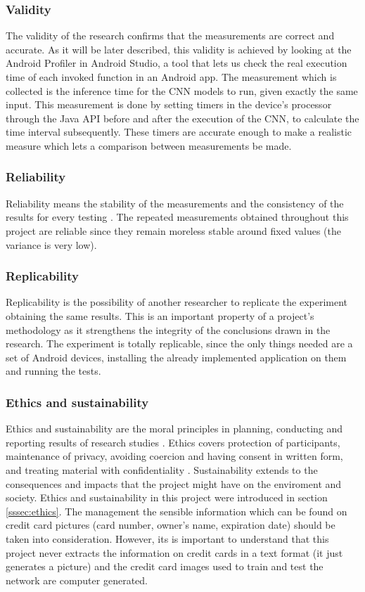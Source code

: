 \subsubsection{Validity} \label{sssec:validity}
	The validity of the research confirms that the measurements are correct and accurate. As it will be later described, this validity is achieved by looking at the Android Profiler in Android Studio, a tool that lets us check the real execution time of each invoked function in an Android app. The measurement which is collected is the inference time for the CNN models to run, given exactly the same input. This measurement is done by setting timers in the device's processor through the Java API before and after the execution of the CNN, to calculate the time interval subsequently. These timers are accurate enough to make a realistic measure which lets a comparison between measurements be made.
\subsubsection{Reliability}
	Reliability means the stability of the measurements and the consistency of the results for every testing \cite{haakansson}. The repeated measurements obtained throughout this project are reliable since they remain moreless stable around fixed values (the variance is very low).
\subsubsection{Replicability}
	Replicability is the possibility of another researcher to replicate the experiment obtaining the same results. This is an important property of a project's methodology as it strengthens the integrity of the conclusions drawn in the research. The experiment is totally replicable, since the only things needed are a set of Android devices, installing the already implemented application on them and running the tests.
\subsubsection{Ethics and sustainability}
	Ethics and sustainability are the moral principles in planning, conducting and reporting results of research studies \cite{myers}. Ethics covers protection of participants, maintenance of privacy, avoiding coercion and having consent in written form, and treating material with confidentiality \cite{haakansson}. Sustainability extends to the consequences and impacts that the project might have on the enviroment and society.
	Ethics and sustainability in this project were introduced in section \ref{sssec:ethics}. The management the sensible information which can be found on credit card pictures (card number, owner's name, expiration date) should be taken into consideration. However, its is important to understand that this project never extracts the information on credit cards in a text format (it just generates a picture) and the credit card images used to train and test the network are computer generated.

